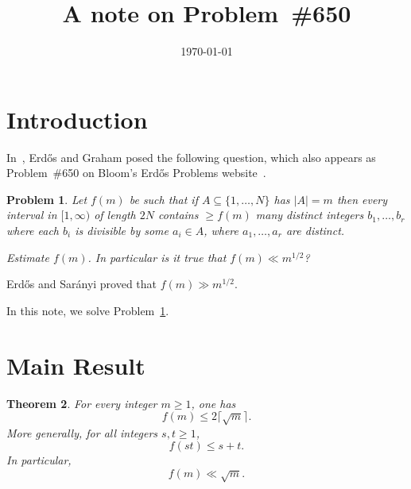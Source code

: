 \documentclass[11pt,letterpaper,reqno]{amsart}
\newtheorem{theorem}{Theorem}[section]
\newtheorem{problem}[theorem]{Problem}
\theoremstyle{definition}
\numberwithin{equation}{section}
\begin{document}
\title{A note on Problem~\#650}





\date{\today}



\maketitle









\section{Introduction}



In~\cite{Er95c}, Erd\H{o}s and Graham posed the following question, which also appears as Problem~\#650 on Bloom's Erd\H{o}s Problems website~\cite{EP}.
\begin{problem}\label{prob:650}
Let $f(m)$ be such that if $A\subseteq \{1,\ldots,N\}$ has $\lvert A\rvert=m$ then every interval in $[1,\infty)$ of length $2N$ contains $\geq f(m)$ many distinct integers $b_1,\ldots,b_r$ where each $b_i$ is divisible by some $a_i\in A$, where $a_1,\ldots,a_r$ are distinct.

Estimate $f(m)$. In particular is it true that $f(m)\ll m^{1/2}$?
\end{problem}



Erd\H{o}s and Sar\'{a}nyi \cite{ErSa59} proved that $f(m)\gg m^{1/2}$.




In this note, we solve Problem~\ref{prob:650}.






\section{Main Result}



\begin{theorem}
For every integer $m \ge 1$, one has
\[
f(m)\le 2\lceil \sqrt m\rceil.
\]
More generally, for all integers $s,t\ge 1$,
\[
f(st)\le s+t.
\]
In particular,
\[
f(m)\ll \sqrt m.
\]
\end{theorem}
\end{document}
